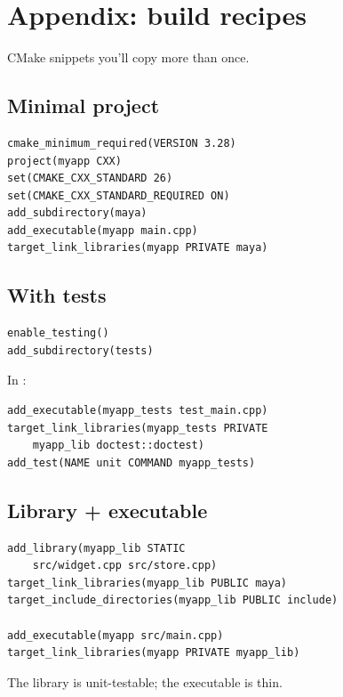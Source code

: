 \chapter{Appendix: build recipes}
\label{ch:buildrecipes}

\begin{aside}
CMake snippets you'll copy more than once.
\end{aside}

\section{Minimal project}

\begin{lstlisting}
cmake_minimum_required(VERSION 3.28)
project(myapp CXX)
set(CMAKE_CXX_STANDARD 26)
set(CMAKE_CXX_STANDARD_REQUIRED ON)
add_subdirectory(maya)
add_executable(myapp main.cpp)
target_link_libraries(myapp PRIVATE maya)
\end{lstlisting}

\section{With tests}

\begin{lstlisting}
enable_testing()
add_subdirectory(tests)
\end{lstlisting}

In :

\begin{lstlisting}
add_executable(myapp_tests test_main.cpp)
target_link_libraries(myapp_tests PRIVATE
    myapp_lib doctest::doctest)
add_test(NAME unit COMMAND myapp_tests)
\end{lstlisting}

\section{Library + executable}

\begin{lstlisting}
add_library(myapp_lib STATIC
    src/widget.cpp src/store.cpp)
target_link_libraries(myapp_lib PUBLIC maya)
target_include_directories(myapp_lib PUBLIC include)

add_executable(myapp src/main.cpp)
target_link_libraries(myapp PRIVATE myapp_lib)
\end{lstlisting}

The library is unit-testable; the executable is thin.

